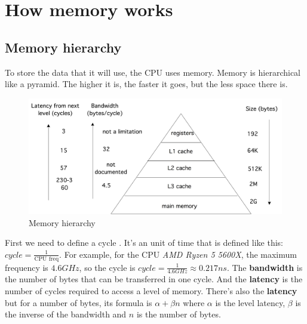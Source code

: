 \documentclass[12pt, openany]{report}
\theoremstyle{definition}
\begin{document}
\section{How memory works}
\subsection{Memory hierarchy} 
To store the data that it will use, the CPU uses memory. Memory is hierarchical like a pyramid. The higher it is, the faster it goes, but the less space there is.
\begin{figure}[H]
    \centering
    \includegraphics[scale=0.15]{img/memory_layout.jpeg}
    \caption{Memory hierarchy}
    \label{fig:memory_hierarchy}
\end{figure}
First we need to define a cycle \label{cycle_def}. It's an unit of time that is defined like this: $cycle = \frac{1}{\text{CPU freq}}$. For example, for the CPU \textit{AMD Ryzen 5 5600X}, the maximum frequency is $4.6 GHz$, so the cycle is $cycle = \frac{1}{4.6 GHz} \approx 0.217 ns$. The \textbf{bandwidth} is the number of bytes that can be transferred in one cycle. And the \textbf{latency} is the number of cycles required to access a level of memory. There's also the \textbf{latency} but for a number of bytes, its formula is $\alpha + \beta n$ where $\alpha$ is the level latency, $\beta$ is the inverse of the bandwidth and $n$ is the number of bytes.\\
\end{document}
